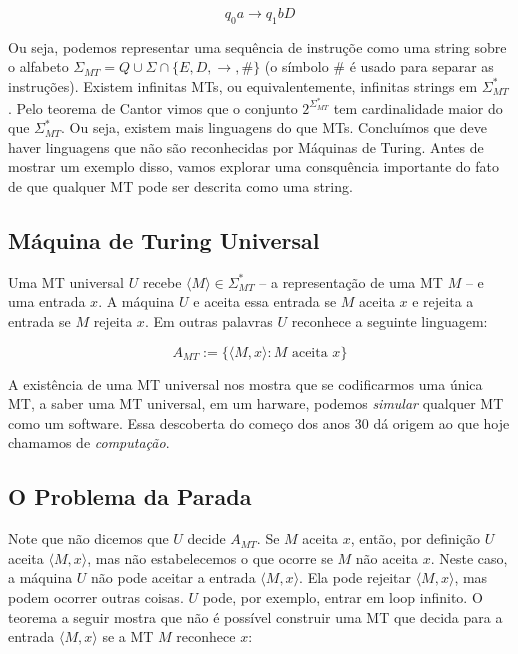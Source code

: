 \begin{displaymath}
  q_0 a \to q_1 b D
\end{displaymath}

Ou seja, podemos representar uma sequência de instruçõe como uma string sobre o alfabeto $\Sigma_{MT} = Q \cup \Sigma \cap \{E, D, \to, \#\}$ (o símbolo $\#$ é usado para separar as instruções).
Existem infinitas MTs, ou equivalentemente, infinitas strings em $\Sigma_{MT}^*$.
Pelo teorema de Cantor vimos que o conjunto $2^{\Sigma_{MT}^*}$ tem cardinalidade maior do que $\Sigma_{MT}^*$.
Ou seja, existem mais linguagens do que MTs.
Concluímos que deve haver linguagens que não são reconhecidas por Máquinas de Turing.
Antes de mostrar um exemplo disso, vamos explorar uma consquência importante do fato de que qualquer MT pode ser descrita como uma string.

\subsection{Máquina de Turing Universal}

Uma MT universal $U$ recebe $\langle M \rangle \in \Sigma_{MT}^*$ -- a representação de uma MT $M$ -- e uma entrada $x$.
A máquina $U$ e aceita essa entrada se $M$ aceita $x$ e rejeita a entrada se $M$ rejeita $x$.
Em outras palavras $U$ reconhece a seguinte linguagem:

\begin{displaymath}
A_{MT} := \{\langle M, x \rangle  : M \textrm{ aceita } x\} 
\end{displaymath}

A existência de uma MT universal nos mostra que se codificarmos uma única MT, a saber uma MT universal, em um harware, podemos {\em simular} qualquer MT como um software.
Essa descoberta do começo dos anos 30 dá origem ao que hoje chamamos de {\em computação}.


\subsection{O Problema da Parada}

Note que não dicemos que $U$ decide $A_{MT}$.
Se $M$ aceita $x$, então, por definição $U$ aceita $\langle M, x\rangle$, mas não estabelecemos o que ocorre se $M$ não aceita $x$.
Neste caso, a máquina $U$ não pode aceitar a entrada $\langle M, x \rangle$.
Ela pode rejeitar $\langle M, x \rangle$, mas podem ocorrer outras coisas.
$U$ pode, por exemplo, entrar em loop infinito.
O teorema a seguir mostra que não é possível construir uma MT que decida para a entrada $\langle M, x \rangle$ se a MT $M$ reconhece $x$:

